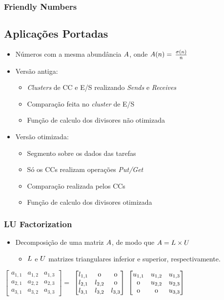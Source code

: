 \documentclass[xcolor={table}]{beamer}
\begin{document}
\begin{frame}\frametitle{Friendly Numbers}
    \subsection{Aplicações Portadas}
    \begin{itemize}
    \item Números com a mesma abundância $\mathnormal{A}$, onde $\mathnormal{A(n) = }$ $\frac{\sigma\mathnormal{(n)}}{\mathnormal{n}}$
    \item{Versão antiga:}
    	\begin{itemize}
    		\item \textit{Clusters} de CC e E/S realizando \textit{Sends} e \textit{Receives} 
    		\item Comparação feita no \textit{cluster} de E/S
    		\item Função de calculo dos divisores não otimizada
    	\end{itemize}
    \item{Versão otimizada:}
    	\begin{itemize}
    		\item Segmento sobre os dados das tarefas
    		\item Só os CCs realizam operações \textit{Put/Get}
    		\item Comparação realizada pelos CCs
    		\item Função de calculo dos divisores otimizada
    	\end{itemize}
    \end{itemize}
\end{frame}

\begin{frame}\frametitle{LU Factorization}
    \begin{itemize}
    \item Decomposição de uma matriz $\mathnormal{A}$, de modo que $\mathnormal{A = L \times U}$	
    	\begin{itemize}
    		\item $\mathnormal{L}$ e $\mathnormal{U}$ matrizes triangulares inferior e superior, respectivamente.
    	\end{itemize}  
    \end{itemize}
    \centering
    $\begin{bmatrix}
  	a_{1,1} & a_{1,2} & a_{1,3} \\
  	a_{2,1} & a_{2,2} & a_{2,3} \\
  	a_{3,1} & a_{3,2} & a_{3,3}   
    \end{bmatrix} =$
    $\begin{bmatrix}
  	l_{1,1} & \mathnormal{0} & \mathnormal{0} \\
  	l_{2,1} & l_{2,2} & \mathnormal{0} \\
  	l_{3,1} & l_{3,2} & l_{3,3}   
    \end{bmatrix}$
    $\begin{bmatrix}
  	u_{1,1} & u_{1,2} & u_{1,3} \\
  	\mathnormal{0} & u_{2,2} & u_{2,3} \\
  	\mathnormal{0} & \mathnormal{0} & u_{3,3}   
    \end{bmatrix}$
\end{frame}
\end{document}

